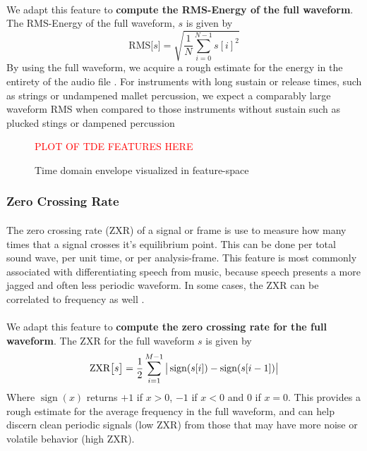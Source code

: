 \documentclass[12pt,letterpaper]{article}
\DeclareMathOperator{\sign}{\text{sign}}
\begin{document}
\paragraph*{}We adapt this feature to \textbf{compute the RMS-Energy of the full waveform}. The RMS-Energy of the full waveform, $s$ is given by \cite{Olson,Virtanen}
\begin{equation}
\label{eqn-RMS}
\text{RMS}\big[ s \big] = \sqrt{\frac{1}{N} \sum_{i=0}^{N-1} s[i]^2}
\end{equation}
By using the full waveform, we acquire a rough estimate for the energy in the entirety of the audio file \cite{Liu}. For instruments with long sustain or release times, such as strings or undampened mallet percussion, we expect a comparably large waveform RMS when compared to those instruments without sustain such as plucked stings or dampened percussion 

\begin{figure}[H]
\label{fig-FeatureTDE}
\begin{center}
\textcolor{red}{PLOT OF TDE FEATURES HERE}
\end{center}
\caption{Time domain envelope visualized in feature-space}
\end{figure}


\subsubsection{Zero Crossing Rate}

\paragraph*{}The zero crossing rate (ZXR) of a signal or frame is use to measure how many times that a signal crosses it's equilibrium point. This can be done per total sound wave, per unit time, or per analysis-frame. This feature is most commonly associated with differentiating speech from music, because speech presents a more jagged and often less periodic waveform. In some cases, the ZXR can be correlated to frequency as well \cite{Kahn,Zhang}. 

\paragraph*{}We adapt this feature to \textbf{compute the zero crossing rate for the full waveform}. The ZXR for the full waveform $s$ is given by \cite{Virtanen,Liu}
\begin{equation}
\label{eqn-ZXR}
\text{ZXR}\big[ s \big] = \frac{1}{2} \sum_{i=1}^{M-1} \big{|} \sign(s[i]) - \sign(s[i-1]) \big{|} 
\end{equation}
Where $\sign(x)$ returns $+1$ if $x > 0$, $-1$ if $x < 0$ and $0$ if $x = 0$. This provides a rough estimate for the average frequency in the full waveform, and can help discern clean periodic signals (low ZXR) from those that may have more noise or volatile behavior (high ZXR)\cite{Virtanen}.
\end{document}
